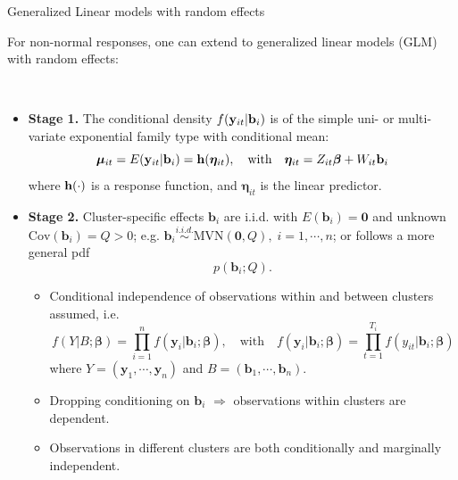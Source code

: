 \documentclass{beamer}
\newcommand{\boldbeta}{{\boldsymbol \beta}}
\newenvironment{wideitemize}%
  {\begin{itemize}%
    \setlength{\parskip}{1em}}%
  {\end{itemize}}
\begin{document}
\begin{frame}{Generalized Linear models with random effects }

For non-normal responses, one  can extend to generalized linear models (GLM) with random effects: 

\ \

\begin{itemize}
\item
\textbf{Stage 1.} The conditional density $f({\bf y}_{it}|\mathbf{b}_i)$ is of the simple uni- or multi-variate
exponential family type with conditional mean:
\begin{equation}
{\boldsymbol \mu}_{it}=E({\bf y}_{it}|\mathbf{b}_i)={\bf h}({\boldsymbol \eta}_{it}), \quad \mbox{with}\quad {\boldsymbol \eta}_{it}= Z_{it} {\boldsymbol
\beta}+ W_{it}\mathbf{b}_i
\label{eq-7.2.2}
\end{equation}
where ${\bf h}(\cdot)$ is a response function, and ${\boldsymbol \eta}_{it}$ is the linear predictor.
\end{itemize}
\end{frame}

\begin{frame}{}
\begin{itemize}
\item
\textbf{Stage 2.} Cluster-specific effects $\mathbf{b}_i$ are i.i.d. with
$E(\mathbf{b}_i)=\mathbf{0}$ and unknown $\text{Cov}(\mathbf{b}_i)=Q>0$; e.g. $\mathbf{b}_i
\stackrel{i.i.d.}{\sim} \text{MVN}(\mathbf{0}, Q), \; i=1,\cdots, n$; or follows a more general pdf 
\[p(\mathbf{b}_i; Q).\]


\begin{wideitemize}
\item 
Conditional independence of observations within and between clusters assumed,  i.e.
\begin{equation}
f(Y|B; \boldbeta)=\prod_{i=1}^n f(\mathbf{y}_i|\mathbf{b}_i; \boldbeta), \quad
\mbox{with}\quad f(\mathbf{y}_i|\mathbf{b}_i;\boldbeta)=\prod_{t=1}^{T_i}
f(y_{it}|\mathbf{b}_i;\boldbeta)
\label{eq-7.2.4}
\end{equation}
where $Y=(\mathbf{y}_1,\cdots, \mathbf{y}_n)$ and $B=(\mathbf{b}_1,\cdots,\mathbf{b}_n)$.
\item
Dropping conditioning on $\mathbf{b}_i$ $\Rightarrow$ observations within clusters are dependent.

\item Observations in different clusters are both conditionally and marginally independent.
\end{wideitemize}
\end{itemize}
\end{frame}
\end{document}
